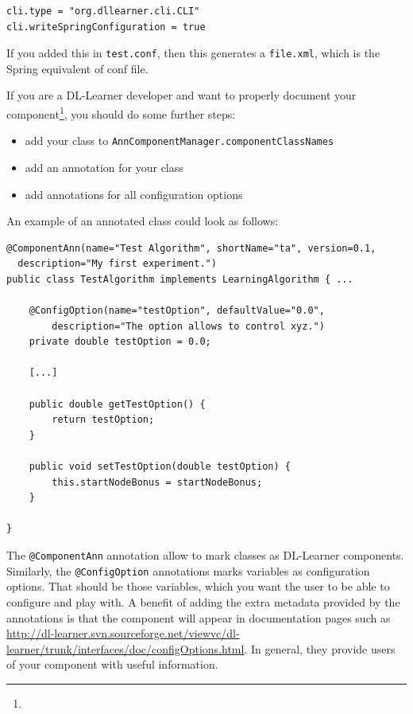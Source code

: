 \documentclass[a4paper,12pt]{scrartcl}
\begin{document}
\begin{verbatim}
cli.type = "org.dllearner.cli.CLI"
cli.writeSpringConfiguration = true
\end{verbatim}

If you added this in \verb|test.conf|, then this generates a \verb|file.xml|, which is the Spring equivalent of conf file.

If you are a DL-Learner developer and want to properly document your component\footnote{}, you should do some further steps:
\begin{itemize}
	\item add your class to \verb|AnnComponentManager.componentClassNames|
	\item add an annotation for your class
	\item add annotations for all configuration options
\end{itemize}

An example of an annotated class could look as follows:

\begin{verbatim}
@ComponentAnn(name="Test Algorithm", shortName="ta", version=0.1, 
  description="My first experiment.")
public class TestAlgorithm implements LearningAlgorithm { ...

    @ConfigOption(name="testOption", defaultValue="0.0", 
        description="The option allows to control xyz.")
    private double testOption = 0.0;

    [...]

    public double getTestOption() {
        return testOption;
    }

    public void setTestOption(double testOption) {
        this.startNodeBonus = startNodeBonus;
    }

}
\end{verbatim}

The \verb|@ComponentAnn| annotation allow to mark classes as DL-Learner components. Similarly, the \verb|@ConfigOption| annotations marks variables as configuration options. That should be those variables, which you want the user to be able to configure and play with. A benefit of adding the extra metadata provided by the annotations is that the component will appear in documentation pages such as \url{http://dl-learner.svn.sourceforge.net/viewvc/dl-learner/trunk/interfaces/doc/configOptions.html}. In general, they provide users of your component with useful information.
\end{document}
